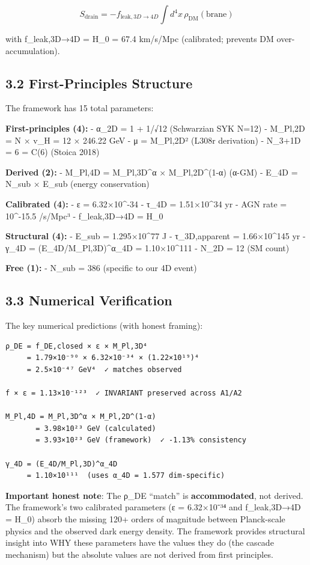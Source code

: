 \documentclass[11pt,a4paper]{article}
\begin{document}
\[S_\text{drain} = -f_{\text{leak},3D\to4D} \int d^4x \, \rho_\text{DM}(\text{brane})\]

with f\_leak,3D→4D = H\_0 = 67.4 km/s/Mpc (calibrated; prevents DM
over-accumulation).

\hypertarget{first-principles-structure}{%
\subsection{3.2 First-Principles
Structure}\label{first-principles-structure}}

The framework has 15 total parameters:

\textbf{First-principles (4):} - α\_2D = 1 + 1/√12 (Schwarzian SYK N=12)
- M\_Pl,2D = N × v\_H = 12 × 246.22 GeV - μ = M\_Pl,2D² (L308r
derivation) - N\_3+1D = 6 = C(6) (Stoica 2018)

\textbf{Derived (2):} - M\_Pl,4D = M\_Pl,3D\^{}α × M\_Pl,2D\^{}(1-α)
(α-GM) - E\_4D = N\_sub × E\_sub (energy conservation)

\textbf{Calibrated (4):} - ε = 6.32×10\^{}-34 - τ\_4D = 1.51×10\^{}34 yr
- AGN rate = 10\^{}-15.5 /s/Mpc³ - f\_leak,3D→4D = H\_0

\textbf{Structural (4):} - E\_sub = 1.295×10\^{}77 J - τ\_3D,apparent =
1.66×10\^{}145 yr - γ\_4D = (E\_4D/M\_Pl,3D)\^{}α\_4D = 1.10×10\^{}111 -
N\_2D = 12 (SM count)

\textbf{Free (1):} - N\_sub = 386 (specific to our 4D event)

\hypertarget{numerical-verification}{%
\subsection{3.3 Numerical Verification}\label{numerical-verification}}

The key numerical predictions (with honest framing):

\begin{verbatim}
ρ_DE = f_DE,closed × ε × M_Pl,3D⁴
     = 1.79×10⁻⁹⁰ × 6.32×10⁻³⁴ × (1.22×10¹⁹)⁴
     = 2.5×10⁻⁴⁷ GeV⁴  ✓ matches observed

f × ε = 1.13×10⁻¹²³  ✓ INVARIANT preserved across A1/A2

M_Pl,4D = M_Pl,3D^α × M_Pl,2D^(1-α)
       = 3.98×10²³ GeV (calculated)
       = 3.93×10²³ GeV (framework)  ✓ -1.13% consistency

γ_4D = (E_4D/M_Pl,3D)^α_4D
     = 1.10×10¹¹¹  (uses α_4D = 1.577 dim-specific)
\end{verbatim}

\textbf{Important honest note}: The ρ\_DE ``match'' is
\textbf{accommodated}, not derived. The framework's two calibrated
parameters (ε = 6.32×10⁻³⁴ and f\_leak,3D→4D = H\_0) absorb the missing
120+ orders of magnitude between Planck-scale physics and the observed
dark energy density. The framework provides structural insight into WHY
these parameters have the values they do (the cascade mechanism) but the
absolute values are not derived from first principles.
\end{document}
